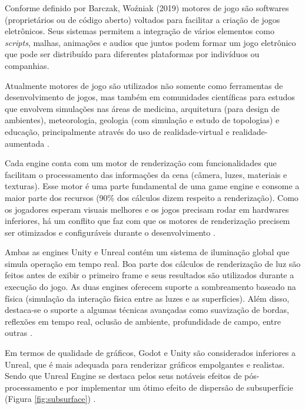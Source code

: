 Conforme definido por Barczak, Woźniak (2019) motores de jogo são softwares (proprietários ou de código aberto) voltados para facilitar a criação de jogos eletrônicos. Seus sistemas permitem a integração de vários elementos como \textit{\Gls{scripts}}, malhas, animações e audios que juntos podem formar um jogo eletrônico que pode ser distribuído para diferentes plataformas por indivíduos ou companhias. 

Atualmente motores de jogo são utilizados não somente como ferramentas de desenvolvimento de jogos, mas também em comunidades científicas para estudos que envolvem simulações nas áreas de medicina, arquitetura (para design de ambientes), meteorologia, geologia (com simulação e estudo de topologias) e educação, principalmente através do uso de \Gls{realidade-virtual} e \Gls{realidade-aumentada} \cite{comparacaoDesempenho2}. 



Cada engine conta com um motor de renderização com funcionalidades que facilitam o processamento das informações da cena (câmera, luzes, materiais e texturas). Esse motor é uma parte fundamental de uma game engine e consome a maior parte dos recursos (90\% dos cálculos dizem respeito a renderização). Como os jogadores esperam visuais melhores e os jogos precisam rodar em hardwares inferiores, há um conflito que faz com que os motores de renderização precisem ser otimizados e configuráveis durante o desenvolvimento \cite{vsmid2017comparison}.

Ambas as engines Unity e Unreal contém um sistema de iluminação global que simula operação em tempo real. Boa parte dos cálculos de renderização de luz são feitos antes de exibir o primeiro frame e seus resultados são utilizados durante a execução do jogo. As duas engines oferecem suporte a sombreamento baseado na física (simulação da interação física entre as luzes e as superfícies). Além disso, destaca-se o suporte a algumas técnicas avançadas como suavização de bordas, reflexões em tempo real, oclusão de ambiente, profundidade de campo, entre outras \cite{compStudyGE}. 

Em termos de qualidade de gráficos, Godot e Unity são considerados inferiores a Unreal, que é mais adequada para renderizar gráficos empolgantes e realistas. Sendo que Unreal Engine se destaca pelos seus notáveis efeitos de pós-processamento e por implementar um ótimo efeito de dispersão de subsuperfície (Figura \ref{fig:subsurface}) \cite{compStudyGE}.


